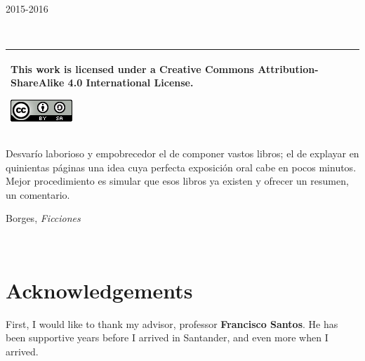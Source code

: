 \documentclass[12pt,a4paper]{article}
\theoremstyle{plain}
\theoremstyle{definition}
\begin{document}
\begin{titlepage}


{\large 2015-2016}\\[3cm] %


 

\vfill %

\end{titlepage}

~\\
\vfill
\begin{tabular}{|p{}|}
\hline
\vspace{0.08cm}
This work is licensed under a Creative Commons Attribution-ShareAlike 4.0 International License.
\begin{center}
\includegraphics[scale=1]{img/ccbysa.png}
\end{center}\\
\hline
\end{tabular}

\newpage

\epigraph{Desvarío laborioso y empobrecedor el de componer vastos libros; el de explayar en quinientas páginas una idea cuya perfecta exposición oral cabe en pocos minutos. Mejor procedimiento es simular que esos libros ya existen y ofrecer un resumen, un comentario.}{Borges, \emph{Ficciones}}
\pagestyle{plain}
\newpage\
\newpage

\thispagestyle{plain}

\section*{Acknowledgements} 

First, I would like to thank my advisor, professor \textbf{Francisco Santos}. He has been supportive years before I arrived in Santander, and even more when I arrived.
\end{document}
